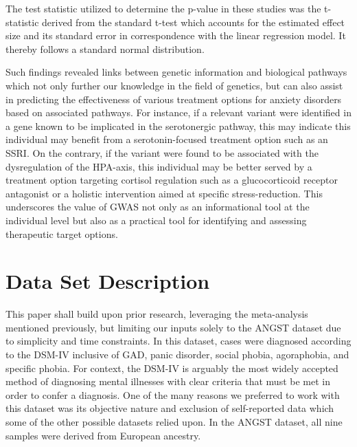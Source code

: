 \documentclass[12pt]{article}
\begin{document}
The test statistic utilized to determine the p-value in these studies was the t-statistic derived from the standard t-test which accounts for the estimated effect size and its standard error in correspondence with the linear regression model. It thereby follows a standard normal distribution. \par

Such findings revealed links between genetic information and biological pathways which not only further our knowledge in the field of genetics, but can also assist in predicting the effectiveness of various treatment options for anxiety disorders based on associated pathways. For instance, if a relevant variant were identified in a gene known to be implicated in the serotonergic pathway, this may indicate this individual may benefit from a serotonin-focused treatment option such as an SSRI. On the contrary, if the variant were found to be associated with the dysregulation of the HPA-axis, this individual may be better served by a treatment option targeting cortisol regulation such as a glucocorticoid receptor antagonist or a holistic intervention aimed at specific stress-reduction. This underscores the value of GWAS not only as an informational tool at the individual level but also as a practical tool for identifying and assessing therapeutic target options. \par
\newpage

\section{Data Set Description}
This paper shall build upon prior research, leveraging the meta-analysis mentioned previously, but limiting our inputs solely to the ANGST dataset due to simplicity and time constraints. In this dataset, cases were diagnosed according to the DSM-IV inclusive of GAD, panic disorder, social phobia, agoraphobia, and specific phobia. For context, the DSM-IV is arguably the most widely accepted method of diagnosing mental illnesses with clear criteria that must be met in order to confer a diagnosis. One of the many reasons we preferred to work with this dataset was its objective nature and exclusion of self-reported data which some of the other possible datasets relied upon. In the ANGST dataset, all nine samples were derived from European ancestry. \par
\end{document}
